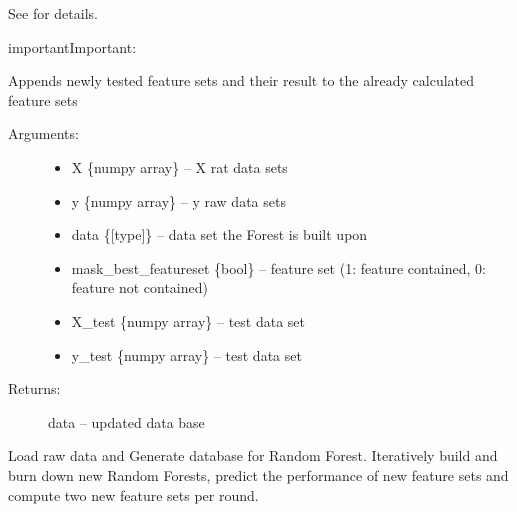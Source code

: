 \documentclass[letterpaper,10pt,english]{sphinxmanual}
\begin{document}
See {\hyperref[\detokenize{Update_Database:update-database-fun}]{}} for details.

\begin{sphinxadmonition}{important}{Important:}
\label{\detokenize{Update_Database:update-database-fun}}

\begin{fulllineitems}
\label{\detokenize{Update_Database:ForestFire.Main.update_database}}
Appends newly tested feature sets and their result to the already calculated feature sets
\begin{description}
\item[{Arguments:}] \leavevmode\begin{itemize}
\item {} 
X \{numpy array\} -- X rat data sets

\item {} 
y \{numpy array\} -- y raw data sets

\item {} 
data \{{[}type{]}\} -- data set the Forest is built upon

\item {} 
mask\_best\_featureset \{bool\} -- feature set (1: feature contained, 0: feature not contained)

\item {} 
X\_test \{numpy array\} -- test data set

\item {} 
y\_test \{numpy array\} -- test data set

\end{itemize}

\item[{Returns:}] \leavevmode
data -- updated data base

\end{description}

\end{fulllineitems}



\begin{fulllineitems}
Load raw data and Generate database for Random Forest. Iteratively build and burn down new Random Forests, predict the performance of new feature sets and compute two new feature sets per round.


\end{fulllineitems}
\end{sphinxadmonition}
\end{document}
